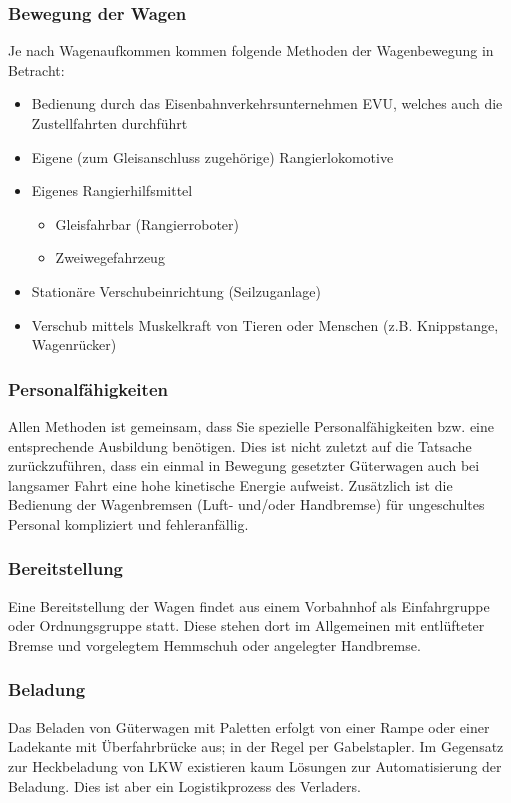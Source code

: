 \subsubsection{Bewegung der Wagen} \label{sec:BewdWagen}
Je nach Wagenaufkommen kommen folgende Methoden der Wagenbewegung in Betracht:
\begin{itemize}
	\item Bedienung durch das \gls{Eisenbahnverkehrsunternehmen} \acrshort{EVU}, welches auch die Zustellfahrten durchführt
	\item Eigene (zum \gls{Gleisanschluss} zugehörige) Rangierlokomotive
	\item Eigenes Rangierhilfsmittel
	\begin{itemize}
	    \item Gleisfahrbar (Rangierroboter)
	    \item Zweiwegefahrzeug
	\end{itemize}
	\item Stationäre Verschubeinrichtung (Seilzuganlage)
	\item Verschub mittels Muskelkraft von Tieren oder Menschen (z.B. Knippstange, Wagenrücker)
\end{itemize}
\subsubsection{Personalfähigkeiten}\label{sec:Personal}
Allen Methoden ist gemeinsam, dass Sie spezielle Personalfähigkeiten bzw. eine entsprechende Ausbildung benötigen. Dies ist nicht zuletzt auf die Tatsache zurückzuführen, dass ein einmal in Bewegung gesetzter Güterwagen auch bei langsamer Fahrt eine hohe kinetische Energie aufweist. Zusätzlich ist die Bedienung der Wagenbremsen (Luft- und/oder Handbremse) für ungeschultes Personal kompliziert und fehleranfällig.
\subsubsection{Bereitstellung}
Eine Bereitstellung der Wagen findet aus einem \gls{Vorbahnhof} als Einfahrgruppe oder Ordnungsgruppe statt. Diese stehen dort im Allgemeinen mit entlüfteter Bremse und vorgelegtem Hemmschuh oder angelegter Handbremse.
\subsubsection{Beladung}
Das Beladen von Güterwagen mit Paletten erfolgt von einer Rampe oder einer Ladekante mit Überfahrbrücke aus; in der Regel per Gabelstapler. Im Gegensatz zur Heckbeladung von LKW existieren kaum Lösungen zur Automatisierung der Beladung. Dies ist aber ein Logistikprozess des Verladers.
